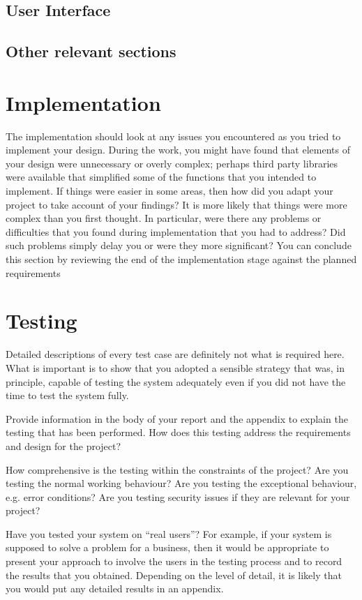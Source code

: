 \section{User Interface}

\section{Other relevant sections}

\chapter{Implementation}
The implementation should look at any issues you encountered as you tried to implement your
design. During the work, you might have found that elements of your design were unnecessary or
overly complex; perhaps third party libraries were available that simplified some of the functions
that you intended to implement. If things were easier in some areas, then how did you adapt your
project to take account of your findings?
It is more likely that things were more complex than you first thought. In particular, were there
any problems or difficulties that you found during implementation that you had to address? Did
such problems simply delay you or were they more significant?
You can conclude this section by reviewing the end of the implementation stage against the
planned requirements

\chapter{Testing}

Detailed descriptions of every test case are definitely not what is required here. What is important is to show that you adopted a sensible strategy that was, in principle, capable of testing the system adequately even if you did not have the time to test the system fully.

Provide information in the body of your report and the appendix to explain the testing that has been performed. How does this testing address the requirements and design for the project?

How comprehensive is the testing within the constraints of the project?  Are you testing the normal working behaviour? Are you testing the exceptional behaviour, e.g. error conditions? Are you testing security issues if they are relevant for your project?

Have you tested your system on ``real users''? For example, if your system is supposed to solve a problem for a business, then it would be appropriate to present your approach to involve the users in the testing process and to record the results that you obtained. Depending on the level of detail, it is likely that you would put any detailed results in an appendix.

